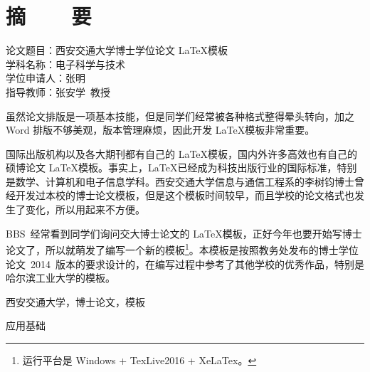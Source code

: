 
\titlespacing{\chapter}{0pt}{23mm}{6mm}
\chapter*{摘~~~~要}
\setcounter{page}{1}

\vskip-50mm
{\xiaosi\hei
	\noindent 论文题目：西安交通大学博士学位论文 \LaTeX 模板 \\
	\noindent 学科名称：电子科学与技术 \\
	\noindent 学位申请人：张明 \\
	\noindent 指导教师：张安学~教授
}
\vskip22mm

虽然论文排版是一项基本技能，但是同学们经常被各种格式整得晕头转向，加之 Word 排版不够美观，版本管理麻烦，因此开发 \LaTeX 模板非常重要。

国际出版机构以及各大期刊都有自己的 \LaTeX 模板，国内外许多高效也有自己的硕博论文 \LaTeX 模板。事实上，\LaTeX 已经成为科技出版行业的国际标准，特别是数学、计算机和电子信息学科。西安交通大学信息与通信工程系的李树钧博士曾经开发过本校的博士论文模板，但是这个模板时间较早，而且学校的论文格式也发生了变化，所以用起来不方便。

BBS~经常看到同学们询问交大博士论文的 \LaTeX 模板，正好今年也要开始写博士论文了，所以就萌发了编写一个新的模板\footnote{运行平台是 \color{red}Windows + TexLive2016 + XeLaTex。}。本模板是按照教务处发布的博士学位论文~2014~版本的要求设计的，在编写过程中参考了其他学校的优秀作品，特别是哈尔滨工业大学的模板。

\vspace{\baselineskip}
 西安交通大学，博士论文，模板

\vspace{\baselineskip}
 应用基础
\clearpage

\titlespacing{\chapter}{0pt}{20.5mm}{5mm}
